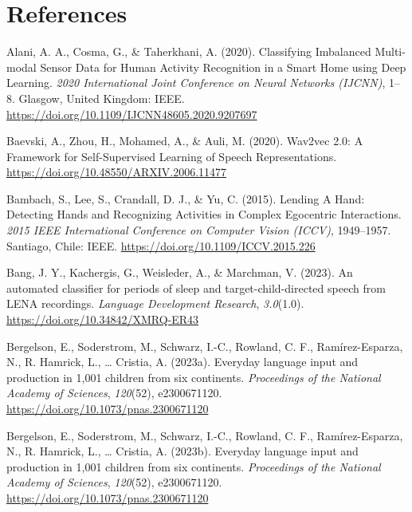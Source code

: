 \documentclass[
  man,floatsintext]{apa6}
\newlength{\cslhangindent}
\newenvironment{CSLReferences}[2] %
 {\begin{list}{}{%
  \setlength{\itemindent}{0pt}
  \setlength{\leftmargin}{0pt}
  \setlength{\parsep}{0pt}
  \ifodd #1
   \setlength{\leftmargin}{\cslhangindent}
   \setlength{\itemindent}{-1\cslhangindent}
  \fi
  \setlength{\itemsep}{#2\baselineskip}}}
 {\end{list}}
\begin{document}
\newpage

\section{References}\label{references}

\begingroup
\setlength{\parindent}{-0.5in}
\setlength{\leftskip}{0.5in}

\label{refs}
\begin{CSLReferences}{1}{0}
Alani, A. A., Cosma, G., \& Taherkhani, A. (2020). Classifying {Imbalanced Multi-modal Sensor Data} for {Human Activity Recognition} in a {Smart Home} using {Deep Learning}. \emph{2020 {International Joint Conference} on {Neural Networks} ({IJCNN})}, 1--8. Glasgow, United Kingdom: IEEE. \url{https://doi.org/10.1109/IJCNN48605.2020.9207697}

Baevski, A., Zhou, H., Mohamed, A., \& Auli, M. (2020). Wav2vec 2.0: {A Framework} for {Self-Supervised Learning} of {Speech Representations}. \url{https://doi.org/10.48550/ARXIV.2006.11477}

Bambach, S., Lee, S., Crandall, D. J., \& Yu, C. (2015). Lending {A Hand}: {Detecting Hands} and {Recognizing Activities} in {Complex Egocentric Interactions}. \emph{2015 {IEEE International Conference} on {Computer Vision} ({ICCV})}, 1949--1957. Santiago, Chile: IEEE. \url{https://doi.org/10.1109/ICCV.2015.226}

Bang, J. Y., Kachergis, G., Weisleder, A., \& Marchman, V. (2023). An automated classifier for periods of sleep and target-child-directed speech from {LENA} recordings. \emph{Language Development Research}, \emph{3.0}(1.0). \url{https://doi.org/10.34842/XMRQ-ER43}

Bergelson, E., Soderstrom, M., Schwarz, I.-C., Rowland, C. F., Ramírez-Esparza, N., R. Hamrick, L., \ldots{} Cristia, A. (2023a). Everyday language input and production in 1,001 children from six continents. \emph{Proceedings of the National Academy of Sciences}, \emph{120}(52), e2300671120. \url{https://doi.org/10.1073/pnas.2300671120}

Bergelson, E., Soderstrom, M., Schwarz, I.-C., Rowland, C. F., Ramírez-Esparza, N., R. Hamrick, L., \ldots{} Cristia, A. (2023b). Everyday language input and production in 1,001 children from six continents. \emph{Proceedings of the National Academy of Sciences}, \emph{120}(52), e2300671120. \url{https://doi.org/10.1073/pnas.2300671120}


\end{CSLReferences}
\end{document}
